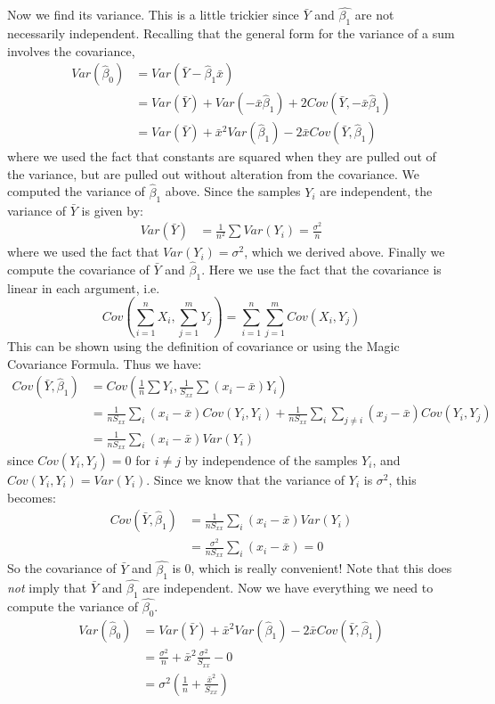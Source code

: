 \documentclass[12pt]{article}
\theoremstyle{definition}
\theoremstyle{remark}
\begin{document}
Now we find its variance. This is a little trickier since $\bar{Y}$ and $\hat{\beta_1}$ are not necessarily independent. Recalling that the general form for the variance of a sum involves the covariance,
\begin{align*}
Var(\hat{\beta}_0) &= Var( \bar{Y} - \hat{\beta}_1 \bar{x} ) \\
&= Var( \bar{Y} ) + Var( - \bar{x} \hat{\beta}_1 ) + 2 Cov (\bar{Y}, - \bar{x} \hat{\beta}_1 ) \\
&= Var( \bar{Y} ) + \bar{x}^2 Var( \hat{\beta}_1 ) - 2 \bar{x} Cov (\bar{Y}, \hat{\beta}_1 )
\end{align*}
where we used the fact that constants are squared when they are pulled out of the variance, but are pulled out without alteration from the covariance. We computed the variance of $\hat{\beta}_1$ above. Since the samples $Y_i$ are independent, the variance of $\bar{Y}$ is given by:
\begin{align*}
Var(\bar{Y}) &= \frac{1}{n^2} \sum Var(Y_i) = \frac{\sigma^2}{n}
\end{align*}
where we used the fact that $Var(Y_i) = \sigma^2$, which we derived above. Finally we compute the covariance of $\bar{Y}$ and $\hat{\beta}_1$. Here we use the fact that the covariance is linear in each argument, i.e. 
\[
Cov\left( \sum_{i=1}^n X_i, \sum_{j=1}^m Y_j\right) = \sum_{i=1}^n \sum_{j=1}^m Cov(X_i, Y_j)
\]
This can be shown using the definition of covariance or using the Magic Covariance Formula. Thus we have:
\begin{align*}
Cov (\bar{Y}, \hat{\beta}_1 ) &= Cov \left( \frac{1}{n} \sum Y_i, \frac{1}{S_{xx}}\sum (x_i - \bar{x})Y_i \right)\\
&= \frac{1}{n S_{xx} } \sum_i (x_i - \bar{x}) Cov(Y_i, Y_i) + \frac{1}{n S_{xx} } \sum_i \sum_{j \neq i} (x_j - \bar{x}) Cov(Y_i, Y_j) \\
&= \frac{1}{n S_{xx} } \sum_i (x_i - \bar{x}) Var(Y_i)
\end{align*}
since $Cov(Y_i, Y_j) = 0$ for $i \neq j$ by independence of the samples $Y_i$, and $Cov(Y_i, Y_i) = Var(Y_i)$. Since we know that the variance of $Y_i$ is $\sigma^2$, this becomes:
\begin{align*}
Cov (\bar{Y}, \hat{\beta}_1 ) &= \frac{1}{n S_{xx} } \sum_i (x_i - \bar{x}) Var(Y_i) \\
&= \frac{\sigma^2}{n S_{xx} } \sum_i (x_i - \bar{x}) = 0
\end{align*}
So the covariance of $\bar{Y}$ and $\hat{\beta_1}$ is 0, which is really convenient! Note that this does \emph{not} imply that $\bar{Y}$ and $\hat{\beta_1}$ are independent. Now we have everything we need to compute the variance of $\hat{\beta_0}$.
\begin{align*}
Var(\hat{\beta}_0) &= Var( \bar{Y} ) + \bar{x}^2 Var( \hat{\beta}_1 ) - 2 \bar{x} Cov (\bar{Y}, \hat{\beta}_1 ) \\
&= \frac{\sigma^2}{n} + \bar{x}^2 \frac{ \sigma^2 }{S_{xx}} - 0 \\
&= \sigma^2 \left( \frac{1}{n} + \frac{ \bar{x}^2 }{S_{xx}} \right) 
\end{align*}
\end{document}
